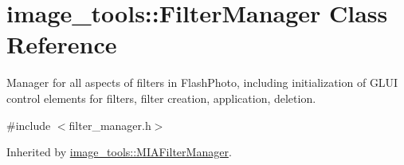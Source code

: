 \hypertarget{classimage__tools_1_1FilterManager}{}\section{image\+\_\+tools\+:\+:Filter\+Manager Class Reference}
\label{classimage__tools_1_1FilterManager}


Manager for all aspects of filters in Flash\+Photo, including initialization of G\+L\+UI control elements for filters, filter creation, application, deletion.  




{\ttfamily \#include $<$filter\+\_\+manager.\+h$>$}



Inherited by \hyperlink{classimage__tools_1_1MIAFilterManager}{image\+\_\+tools\+::\+M\+I\+A\+Filter\+Manager}.

